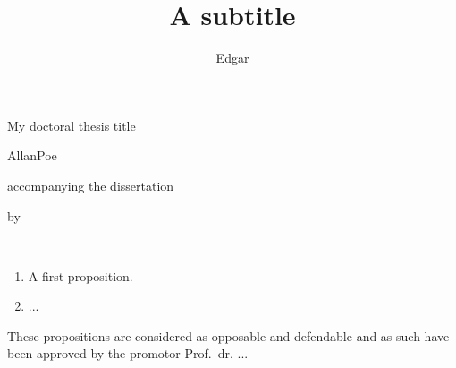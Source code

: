 \documentclass[10pt]{book}
\begin{document}

\crop[cam] %

\title{A subtitle}{My doctoral thesis title}
\author{Edgar}{Allan}{Poe}

\pagestyle{empty}

\begin{center}

{\makeatletter
\bfseries\Large{}
\makeatother}

\smallskip

{\large accompanying the dissertation}

\bigskip
\medskip

{\makeatletter
\bfseries\LARGE\sffamily{\@title}
\makeatother}

{\makeatletter
\ifx\@subtitle\undefined\else
    \smallskip
    \Large\@subtitle
\fi
\makeatother}

\medskip

{\large by}

\medskip

\makeatletter
{\large \@firstname~\@middlename~{\MakeUppercase \@lastname}}
\makeatother

\end{center}

\bigskip

\begin{enumerate}
	\item A first proposition.
	{\hfill {}}
	\item ...
\end{enumerate}

\vfill

\bigskip

\noindent These propositions are considered as opposable and defendable and as such have been approved by the promotor Prof.~dr. ...


\clearpage


\pagestyle{empty}
\end{document}
